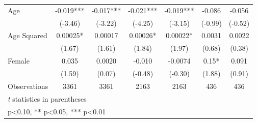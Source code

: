 \begin{table}[htbp]
\begin{tabular}{l*{6}{c}}
Age             &   -0.019***&   -0.017***&   -0.021***&   -0.019***&   -0.086   &   -0.056   \\
                &  (-3.46)   &  (-3.22)   &  (-4.25)   &  (-3.15)   &  (-0.99)   &  (-0.52)   \\
Age Squared     &  0.00025*  &  0.00017   &  0.00026*  &  0.00022*  &   0.0031   &   0.0022   \\
                &   (1.67)   &   (1.61)   &   (1.84)   &   (1.97)   &   (0.68)   &   (0.38)   \\
Female          &    0.035   &   0.0020   &   -0.010   &  -0.0074   &     0.15*  &    0.091   \\
                &   (1.59)   &   (0.07)   &  (-0.48)   &  (-0.30)   &   (1.88)   &   (0.91)   \\
\hline
Observations    &     3361   &     3361   &     2163   &     2163   &      436   &      436   \\
\hline\hline
\multicolumn{7}{l}{\footnotesize \textit{t} statistics in parentheses}\\
\multicolumn{7}{l}{\footnotesize * p<0.10, ** p<0.05, *** p<0.01}\\
\end{tabular}
\end{table}
